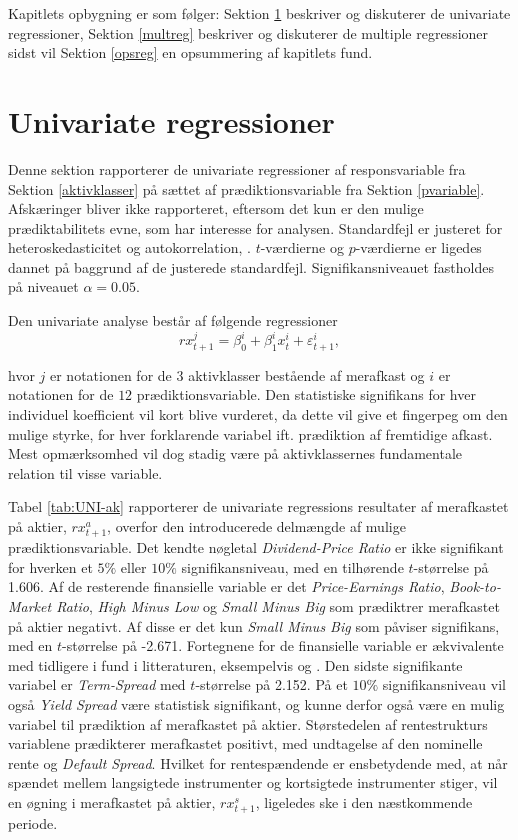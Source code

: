 \documentclass[
  a4paper,
  oneside]{memoir}
\begin{document}
Kapitlets opbygning er som følger: Sektion \ref{unireg} beskriver og diskuterer de univariate regressioner, Sektion \ref{multreg} beskriver og diskuterer de multiple regressioner sidst vil Sektion \ref{opsreg} en opsummering af kapitlets fund.

\hypertarget{unireg}{%
\section{Univariate regressioner}\label{unireg}}

Denne sektion rapporterer de univariate regressioner af responsvariable fra Sektion \ref{aktivklasser} på sættet af prædiktionsvariable fra Sektion \ref{pvariable}. Afskæringer bliver ikke rapporteret, eftersom det kun er den mulige prædiktabilitets evne, som har interesse for analysen. Standardfejl er justeret for heteroskedasticitet og autokorrelation, \citep{Newey1987}. \(t\)-værdierne og \(p\)-værdierne er ligedes dannet på baggrund af de justerede standardfejl. Signifikansniveauet fastholdes på niveauet \(\alpha=0.05\).

Den univariate analyse består af følgende regressioner
\[rx_{t+1}^j=\beta_{0}^i+\beta_{1}^ix_{t}^i+\varepsilon_{t+1}^i,\]

hvor \(j\) er notationen for de \(3\) aktivklasser bestående af merafkast og \(i\) er notationen for de \(12\) prædiktionsvariable. Den statistiske signifikans for hver individuel koefficient vil kort blive vurderet, da dette vil give et fingerpeg om den mulige styrke, for hver forklarende variabel ift. prædiktion af fremtidige afkast. Mest opmærksomhed vil dog stadig være på aktivklassernes fundamentale relation til visse variable.

Tabel \ref{tab:UNI-ak} rapporterer de univariate regressions resultater af merafkastet på aktier, \(rx_{t+1}^a\), overfor den introducerede delmængde af mulige prædiktionsvariable. Det kendte nøgletal \emph{Dividend-Price Ratio} er ikke signifikant for hverken et \(5\%\) eller \(10\%\) signifikansniveau, med en tilhørende \(t\)-størrelse på 1.606. Af de resterende finansielle variable er det \emph{Price-Earnings Ratio}, \emph{Book-to-Market Ratio}, \emph{High Minus Low} og \emph{Small Minus Big} som prædiktrer merafkastet på aktier negativt. Af disse er det kun \emph{Small Minus Big} som påviser signifikans, med en \(t\)-størrelse på -2.671. Fortegnene for de finansielle variable er ækvivalente med tidligere i fund i litteraturen, eksempelvis \citep{Camp1987} og \citep{CampVicCha2003}. Den sidste signifikante variabel er \emph{Term-Spread} med \(t\)-størrelse på 2.152. På et \(10\%\) signifikansniveau vil også \emph{Yield Spread} være statistisk signifikant, og kunne derfor også være en mulig variabel til prædiktion af merafkastet på aktier. Størstedelen af rentestrukturs variablene prædikterer merafkastet positivt, med undtagelse af den nominelle rente og \emph{Default Spread}. Hvilket for rentespændende er ensbetydende med, at når spændet mellem langsigtede instrumenter og kortsigtede instrumenter stiger, vil en øgning i merafkastet på aktier, \(rx_{t+1}^s\), ligeledes ske i den næstkommende periode.
\end{document}
